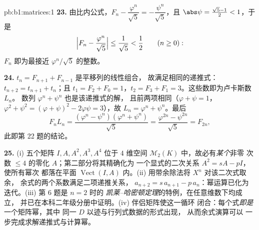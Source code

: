 \begin{solution}{pb:b1:matrices:1}
\textbf{23.} 由比内公式，$F_n - \dfrac{\varphi^n}{\sqrt5} =
-\dfrac{\psi^n}{\sqrt5}$，且 $\abs\psi = \frac{\sqrt5 - 1}2 <
1$，于是
\[
\Bigl|F_n - \frac{\varphi^n}{\sqrt5}\Bigr|
\leq \frac{1}{\sqrt5} < \frac12
\qquad (n \geq 0):
\]
$F_n$ 即为最接近 $\varphi^n/\sqrt5$ 的整数。

\textbf{24.} $t_n = F_{n+1} + F_{n-1}$ 是平移列的线性组合，
故满足相同的递推式：
$t_{n+2} = t_{n+1} + t_n$；且 $t_1 = F_2 + F_0 =
1$，$t_2 = F_3 + F_1 = 3$。这些数即为卢卡斯数 $L_n$。
数列 $\varphi^n + \psi^n$ 也是该递推式的解，
且前两项相同（$\varphi + \psi = 1$，$\varphi^2 + \psi^2 = (
\varphi + \psi)^2 - 2\varphi\psi = 3$），故 $L_n = \varphi^n +
\psi^n$。最后
\[
F_n L_n = \frac{(\varphi^n - \psi^n)(\varphi^n +
\psi^n)}{\sqrt5} = \frac{\varphi^{2n} - \psi^{2n}}{\sqrt5} =
F_{2n},
\]
此即第 22 题的结论。

\textbf{25.} (i) 五个矩阵 $I, A, A^2, A^3, A^4$ 位于
$4$ 维空间 $\mathcal{M}_2(K)$ 中，故必有\emph{某个}非零
次数 $\leq 4$ 的零化 $A$；第二部分将其精确化为
一个显式的二次关系 $A^2 = sA - pI$，使所有幂次
都落在平面 $\operatorname{Vect}(I, A)$ 内。(ii)
用带余除法将 $X^n$ 对该二次式取余，
余式的两个系数满足二项递推关系，
$a_{n+2} = s\,a_{n+1} - p\,a_n$：幂运算已化为
迭代。(iii) 第 6 题是 $n = 2$ 时的
\emph{凯莱–哈密顿定理}的特例，在任意维数下均成立，
并已在本科二年级分册中证明。(iv) 伴侣矩阵使这一循环
闭合：每个式\emph{即是}一个矩阵幂，其中
同一 $D$ 以迹与行列式数据的形式出现，
从而余式演算可以
一步完成求解递推式与计算幂。
\end{solution}
